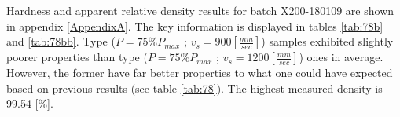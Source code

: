  \begin{center}
\begin{table}[ht]
\noindent{}

\caption[Standard deviations and average values for apparent relative densities and hardnesses of the specimens of batch X200-171024]{Standard deviations and average values for apparent relative densities and hardnesses of the specimens of batch X200-171024}
\label{tab:78}
\end{table}
 \end{center}

Hardness and apparent relative density results for batch X200-180109 are shown in appendix \ref{AppendixA}. The key information is displayed in tables \ref{tab:78b} and \ref{tab:78bb}. Type ($P=75\% P_{max}$ ; $v_s=900 [\frac{mm}{sec}]$) samples exhibited slightly poorer properties than type ($P=75\% P_{max}$ ; $v_s=1200 [\frac{mm}{sec}]$) ones in average. However, the former have far better properties to what one could have expected based on previous results (see table \ref{tab:78}). The highest measured density is 99.54 [\%].\\





